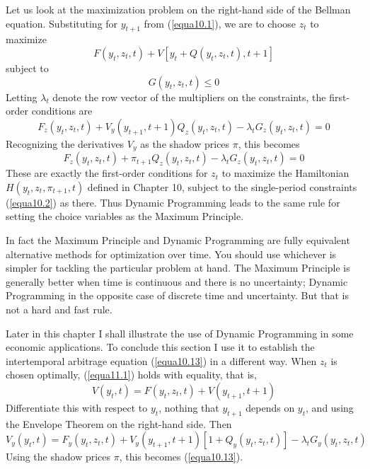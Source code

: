 Let us look at the maximization problem on the right-hand side of the Bellman equation. Substituting for $y_{t+1}$ from (\ref{equa10.1}), we are to choose $z_t$ to maximize
\begin{equation*}
 F(y_t, z_t, t ) + V[y_t + Q(y_t, z_t, t) , t+1]
\end{equation*}
subject to 
\begin{equation*}
G(y_t, z_t, t) \leq 0
\end{equation*}
Letting $\lambda_t$ denote the row vector of the multipliers on the constraints, the first-order conditions are
\begin{equation*}
F_z(y_t, z_t,t) + V_y(y_{t+1}, t+1) Q_z(y_t, z_t, t) - \lambda_t G_z(y_t, z_t,t) =0
\end{equation*}
Recognizing the derivatives $V_y$ as the shadow prices $\pi$, this becomes
\begin{equation*}
F_z(y_t, z_t, t) + \pi_{t+1} Q_z(y_t, z_t, t) - \lambda_t G_z(y_t, z_t, t) =0
\end{equation*}
These are exactly the first-order conditions for $z_t$ to maximize the Hamiltonian $H(y_t, z_t, \pi_{t+1}, t)$ defined in Chapter 10, subject to the single-period constraints (\ref{equa10.2}) as there. Thus Dynamic Programming leads to the same rule for setting the choice variables as the Maximum Principle.

In fact the Maximum Principle and Dynamic Programming are fully equivalent alternative methods for optimization over time. You should use whichever is simpler for tackling the particular problem at hand. The Maximum Principle is generally better when time is continuous and there is no uncertainty; Dynamic Programming in the opposite case of discrete time and uncertainty. But that is not a hard and fast rule.

Later in this chapter I shall illustrate the use of Dynamic Programming in some economic applications. To conclude this section I use it to establish the intertemporal arbitrage equation (\ref{equa10.13}) in a different way. When $z_t$ is chosen optimally, (\ref{equa11.1}) holds with equality, that is,
\begin{equation*}
 V(y_t, t) = F(y_t, z_t, t) + V(y_{t+1}, t+1)
\end{equation*}
Differentiate this with respect to $y_t$, nothing that $y_{t+1}$ depends on $y_t$, and using the Envelope Theorem on the right-hand side. Then
\begin{equation*}
 V_y(y_t, t) = F_y(y_t, z_t, t) + V_y(y_{t+1}, t+1)[1+Q_y(y_t, z_t, t) ] - \lambda_t G_y(y_t , z_t, t)
\end{equation*}
Using the shadow prices $\pi$, this becomes (\ref{equa10.13}).

